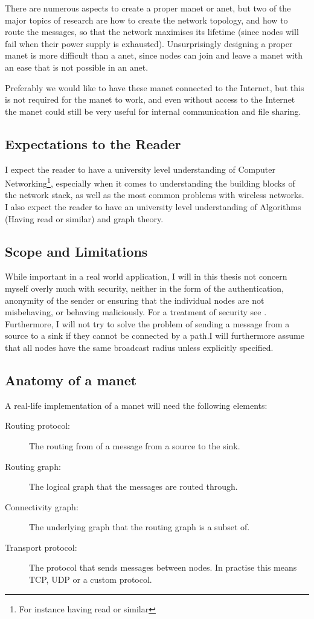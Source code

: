 There are numerous aspects to create a proper \ac{manet} or \ac{anet}, but two of the major topics of research are how to create the network topology, and how to route the messages, so that the network maximises its lifetime (since nodes will fail when their power supply is exhausted). Unsurprisingly designing a proper \ac{manet} is more difficult than a \ac{anet}, since nodes can join and leave a \ac{manet} with an ease that is not possible in an \ac{anet}. 

Preferably we would like to have these \ac{manet} connected to the Internet, but this is not required for the \ac{manet} to work, and even without access to the Internet the \ac{manet} could still be very useful for internal communication and file sharing. 
 

\subsection{Expectations to the Reader}
I expect the reader to have a university level understanding of Computer Networking\footnote{For instance having read \cite{ComNet} or similar}, especially when it comes to understanding the building blocks of the network stack, as well as the most common problems with wireless networks. I also expect the reader to have an university level understanding of Algorithms (Having read \cite{algo} or similar) and graph theory.

\subsection{Scope and Limitations}
While important in a real world application, I will in this thesis not concern myself overly much with security, neither in the form of the authentication, anonymity of the sender or ensuring that the individual nodes are not misbehaving, or behaving maliciously. For a treatment of security see \cite{trustedRouting}. Furthermore, I will not try to solve the problem of sending a message from a source to a sink if they cannot be connected by a path.I will furthermore assume that all nodes have the same broadcast radius unless explicitly specified.

\subsection{Anatomy of a \ac{manet}}
A real-life implementation of a \ac{manet} will need the following elements:
\begin{description}
\item[Routing protocol:] The routing from of a message from a source to the sink.
\item[Routing graph:] The logical graph that the messages are routed through.
\item[Connectivity graph:] The underlying graph that the routing graph is a subset of.
\item[Transport protocol:] The protocol that sends messages between nodes. In practise this means TCP, UDP or a custom protocol.
\end{description}

